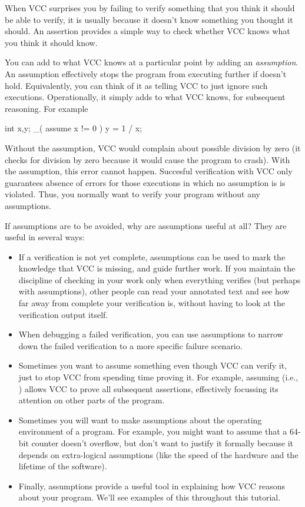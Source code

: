 When VCC surprises you by failing to verify something that you think
it should be able to verify, it is usually because it doesn't know
something you thought it should. An assertion provides a simple way to
check whether VCC knows what you think it should know.

You can add to what VCC knows at a particular point by adding an
\emph{assumption}. An assumption  effectively stops
the program from executing further if  doesn't
hold. Equivalently, you can think of it as telling VCC to just ignore
such executions. Operationally, it simply adds  to what VCC
knows, for subsequent reasoning. For example
\begin{VCC}
  int x,y;
  _( assume x != 0 )
  y = 1 / x;
\end{VCC}

Without the assumption, VCC would complain about possible division by
zero (it checks for division by zero because it would cause the
program to crash).  With the assumption, this error cannot happen.
Succesful verification with VCC only guarantees absence of errors for
those executions in which no assumption is is violated. Thus, you
normally want to verify your program without any assumptions.

If assumptions are to be avoided, why are assumptions useful at
all? They are useful in several ways:
\begin{itemize}
\item If a verification is not yet complete, assumptions can be used
  to mark the knowledge that VCC is missing, and guide further work.
  If you maintain the discipline of checking in your work only when
  everything verifies (but perhaps with assumptions), other people can
  read your annotated text and see how far away from complete your
  verification is, without having to look at the verification output
  itself.
\item When debugging a failed verification, you can use assumptions to
  narrow down the failed verification to a more specific failure
  scenario.
\item Sometimes you want to assume something even though VCC can
  verify it, just to stop VCC from spending time proving it. For
  example, assuming  (i.e., \vcc{\false}) allows VCC to prove
  all subsequent assertions, effectively focussing its attention on
  other parts of the program.
\item Sometimes you will want to make assumptions about the operating
  environment of a program. For example, you might want to assume that
  a 64-bit counter doesn't overflow, but don't want to justify it
  formally because it depends on extra-logical assumptions (like the
  speed of the hardware and the lifetime of the software). 
\item Finally, assumptions provide a useful tool in explaining how VCC
  reasons about your program. We'll see examples of this throughout
  this tutorial.
\end{itemize}

